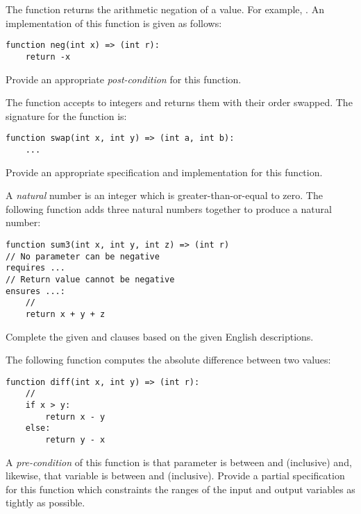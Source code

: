 \begin{ex}
The function  returns the arithmetic negation of a value.
For example, .  An implementation of
this function is given as follows:
\begin{lstlisting}
function neg(int x) => (int r):
    return -x
\end{lstlisting}
Provide an appropriate {\em post-condition} for this function.
\end{ex}

\begin{ex}
The  function accepts to integers and returns them
with their order swapped.  The signature for the function is:
\begin{lstlisting}
function swap(int x, int y) => (int a, int b):
    ...
\end{lstlisting}
Provide an appropriate specification and implementation for this function.
\end{ex}

\begin{ex}

A {\em natural} number is an integer which is greater-than-or-equal to
zero.  The following function adds three natural numbers together to produce a natural number:
\begin{lstlisting}
function sum3(int x, int y, int z) => (int r)
// No parameter can be negative
requires ...
// Return value cannot be negative
ensures ...:
    //
    return x + y + z
\end{lstlisting}
Complete the given  and 
clauses based on the given English descriptions.

\end{ex}

\begin{ex}
  The following function computes the absolute difference between two values:

\begin{lstlisting}
function diff(int x, int y) => (int r):
    //
    if x > y:
        return x - y
    else:
        return y - x
\end{lstlisting}

A {\em pre-condition} of this function is that parameter 
is between  and  (inclusive) and,
likewise, that variable  is between  and
 (inclusive).  Provide a partial specification for
this function which constraints the ranges of the input and output
variables as tightly as possible.
\end{ex}

